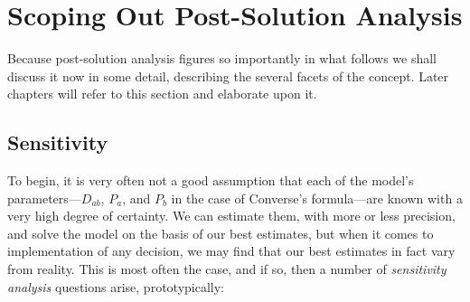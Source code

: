 %
%
%

\clearpage

\section{Scoping Out Post-Solution Analysis}

Because post-solution analysis figures so importantly in what follows we shall discuss it now in some detail, describing the several facets of the concept. Later chapters will refer to this section and elaborate upon it.

\subsection{Sensitivity}

To begin, it is very often not a good assumption that each of the model's parameters---$D_{ab}$, $P_a$, and $P_b$ in the case of Converse's formula---are known with a very high degree of certainty. We can estimate them, with more or less precision, and solve the model on the basis of our best estimates, but when it comes to implementation of any decision, we may find that our best estimates in fact vary from reality. This is most often the case, and 
if so, then a number of \emph{sensitivity analysis} questions arise, prototypically:

